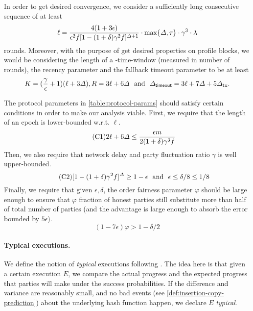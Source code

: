 In order to get desired convergence, we consider a sufficiently long consecutive sequence of at least
%
\begin{equation} \label{eq:ell-length}
    \ell = \frac{4(1 + 3\epsilon)}{\epsilon^2 f [1 - (1 + \delta) \gamma^2 f]^{\varDelta + 1}} \cdot \max \{\varDelta, \tau\} \cdot \gamma^3 \cdot \lambda
\end{equation}
%
rounds.
%
Moreover, with the purpose of get desired properties on profile blocks, we would be considering the length of a \PBWindowLen-time-window (measured in number of rounds), the recency parameter and the fallback timeout parameter to be at least
%
\begin{equation} \label{eq:window-length}
    K = (\frac{\gamma}{\epsilon} + 1) (\ell + 3\varDelta), R = 3\ell + 6\varDelta  ~~\text{and}~~ \varDelta_{\mathsf{timeout}} = 3\ell + 7\varDelta + 5\varDelta_{\mathrm{tx}}.
\end{equation}

The protocol parameters in \cref{table:protocol-params} should satisfy certain conditions in order to make our analysis viable.
%
First, we require that the length of an epoch is lower-bounded w.r.t. $\ell$.
%
\begin{equation} \label{condition:min-length} \tag{C1}
    2\ell + 6\varDelta \le \frac{\epsilon m}{2(1 + \delta)\gamma^3 f}
\end{equation}
%
Then, we also require that network delay \delay and party fluctuation ratio $\gamma$ is well upper-bounded.
%
\begin{equation} \label{condition:error-absorb} \tag{C2}
    [1 - (1 + \delta)\gamma^2 f]^\varDelta \ge 1 - \epsilon ~~\text{and}~~ \epsilon \le \delta / 8 \le 1 / 8
\end{equation}
%
Finally, we require that given $\epsilon, \delta$, the order fairness parameter $\varphi$ should be large enough to ensure that $\varphi$ fraction of honest parties still substitute more than half of total number of parties (and the advantage is large enough to absorb the error bounded by $5\epsilon$).
%
\begin{equation} \label{condition:order-fairness-param} \tag{C3}
    (1 - 7\epsilon) \varphi > 1 - \delta / 2
\end{equation}

\paragraph{Typical executions.}
%
We define the notion of \emph{typical} executions following \cite{C:GarKiaLeo17,EPRINT:GarKiaLeo20}.
%
The idea here is that given a certain execution $E$, we compare the actual progress and the expected progress that parties will make under the success probabilities.
%
If the difference and variance are reasonably small, and no bad events (see \cref{def:insertion-copy-prediction}) about the underlying hash function happen, we declare $E$ \emph{typical}.

